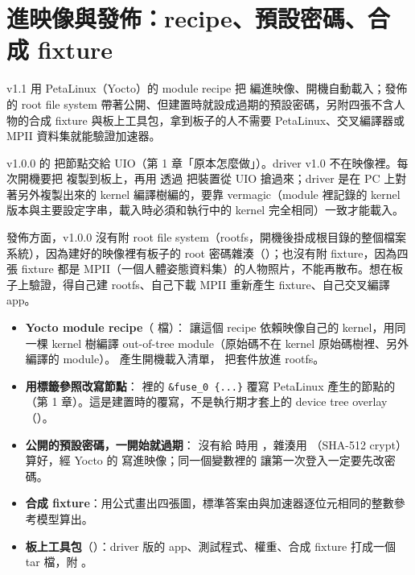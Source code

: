 \section{進映像與發佈：recipe、預設密碼、合成 fixture}
\label{sec:release}

\begin{oneline}
v1.1 用 PetaLinux（Yocto）的 module recipe 把  編進映像、開機自動載入；發佈的 root file system 帶著公開、但建置時就設成過期的預設密碼，另附四張不含人物的合成 fixture 與板上工具包，拿到板子的人不需要 PetaLinux、交叉編譯器或 MPII 資料集就能驗證加速器。
\end{oneline}

\begin{before}
v1.0.0 的  把節點交給 UIO（第 1 章「原本怎麼做」）。driver v1.0 不在映像裡。每次開機要把  複製到板上，再用  透過  把裝置從 UIO 搶過來；driver 是在 PC 上對著另外複製出來的 kernel 編譯樹編的，要靠 vermagic（module 裡記錄的 kernel 版本與主要設定字串，載入時必須和執行中的 kernel 完全相同）一致才能載入。

發佈方面，v1.0.0 沒有附 root file system（rootfs，開機後掛成根目錄的整個檔案系統），因為建好的映像裡有板子的 root 密碼雜湊（）；也沒有附 fixture，因為四張 fixture 都是 MPII（一個人體姿態資料集）的人物照片，不能再散布。想在板子上驗證，得自己建 rootfs、自己下載 MPII 重新產生 fixture、自己交叉編譯 app。
\end{before}

\begin{tech}
\begin{itemize}
\item \textbf{Yocto module recipe}（ 檔）： 讓這個 recipe 依賴映像自己的 kernel，用同一棵 kernel 樹編譯 out-of-tree module（原始碼不在 kernel 原始碼樹裡、另外編譯的 module）。 產生開機載入清單， 把套件放進 rootfs。
\item \textbf{用標籤參照改寫節點}： 裡的 \texttt{\&fuse\_0 \{...\}} 覆寫 PetaLinux 產生的節點的 （第 1 章）。這是建置時的覆寫，不是執行期才套上的 device tree overlay（）。
\item \textbf{公開的預設密碼，一開始就過期}： 沒有給  時用 ，雜湊用 （SHA-512 crypt）算好，經 Yocto 的  寫進映像；同一個變數裡的  讓第一次登入一定要先改密碼。
\item \textbf{合成 fixture}：用公式畫出四張圖，標準答案由與加速器逐位元相同的整數參考模型算出。
\item \textbf{板上工具包}（）：driver 版的 app、測試程式、權重、合成 fixture 打成一個 tar 檔，附 。
\end{itemize}
\end{tech}

